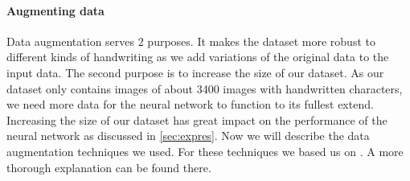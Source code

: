 \documentclass{article}
\begin{document}
\paragraph{Augmenting data}
\label{par:aug}
Data augmentation serves 2 purposes. It makes the dataset more robust to different kinds of handwriting as we add variations of the original data to the input data. The second purpose is to increase the size of our dataset. As our dataset only contains images of about 3400 images with handwritten characters, we need more data for the neural network to function to its fullest extend. Increasing the size of our dataset has great impact on the performance of the neural network as discussed in \ref{sec:expres}. Now we will describe the data augmentation techniques we used. For these techniques we based us on \cite{DataAug}. A more thorough explanation can be found there. 
\end{document}
